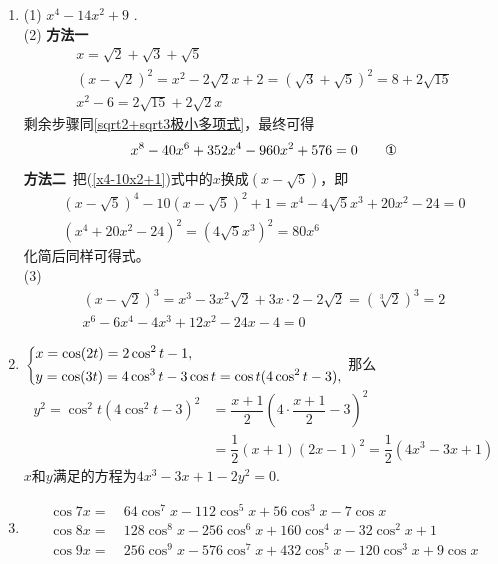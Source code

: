 \begin{enumerate}[label={\textbf{\thechapter.\arabic*}},leftmargin=
    \inteval{\myenumleftmargin}pt]
\item (1) $ x^4-14x^2+9 $ .\\
(2) \textbf{方法一}\ 
\begin{gather*}
    x= \sqrt{2}+\sqrt{3}+\sqrt{5} \\
    (x-\sqrt{2})^2=x^2-2\sqrt{2}x+2= (\sqrt{3}+\sqrt{5})^2= 8+2\sqrt{15} \\
    x^2-6=2\sqrt{15}+2\sqrt{2}x
\end{gather*}
剩余步骤同\ref{sqrt2+sqrt3极小多项式}，最终可得
\begin{align}
    x^8-40x^6+352x^4-960x^2+576=0  \tag*{\ding{172}}
\end{align}
\textbf{方法二}\ 把(\ref{x4-10x2+1})式中的$ x $换成$ (x-\sqrt{5}) $，即
\begin{gather*}
    (x-\sqrt{5})^4-10(x-\sqrt{5})^2+1=x^4-4\sqrt{5}x^3+20x^2-24=0\\
    (x^4+20x^2-24)^2=(4\sqrt{5}x^3)^2=80x^6
\end{gather*}
化简后同样可得式。 \\
(3)
\begin{gather*}
    (x-\sqrt{2})^3=x^3-3x^2\sqrt{2}+3x\cdot 2-2\sqrt{2}=(\sqrt[3]{2})^3=2 \\
    x^6-6x^4-4x^3+12x^2-24x-4=0
\end{gather*}

\item $ \begin{dcases}
    x=\cos(2t)=2\cos^2t-1 ,\\
    y=\cos(3t)=4\cos^3t-3\cos t=\cos t(4\cos^2t-3),
\end{dcases} $ 那么
\begin{align*}
    y^2=\cos^2 t(4\cos^2t-3)^2 &=
    \dfrac{x+1}{2}\left(4\cdot \dfrac{x+1}{2} -3\right)^2 \\
    &= \dfrac{1}{2}(x+1)(2x-1)^2=\dfrac{1}{2}(4x^3-3x+1) 
\end{align*}
$x$和$y$满足的方程为$ 4x^3-3x+1-2y^2=0 $.

\item
\begin{align*}
   \cos 7x=&\ 64\cos^7x-112\cos^5x+56\cos^3x-7\cos x \\
   \cos 8x=&\ 128\cos^8x-256\cos^6x+160\cos^4x-32\cos^2x+1 \\
   \cos 9x=&\ 256\cos^9x-576\cos^7x+432\cos^5x-120\cos^3x+9\cos x
\end{align*}


\end{enumerate}
